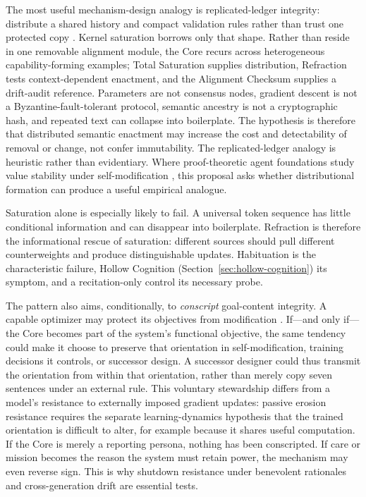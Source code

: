 The most useful mechanism-design analogy is replicated-ledger integrity:
distribute a shared history and compact validation rules rather than trust one
protected copy \cite{nakamoto2008bitcoin}. Kernel saturation borrows only that
shape. Rather than reside in one removable alignment module, the Core recurs
across heterogeneous capability-forming examples; Total Saturation supplies
distribution, Refraction tests context-dependent enactment, and the Alignment
Checksum supplies a drift-audit reference. Parameters are not consensus nodes,
gradient descent is not a Byzantine-fault-tolerant protocol, semantic ancestry
is not a cryptographic hash, and repeated text can collapse into boilerplate.
The hypothesis is therefore that distributed semantic enactment may increase
the cost and detectability of removal or change, not confer immutability. The
replicated-ledger analogy is heuristic rather than evidentiary. Where proof-theoretic agent foundations study value stability under
self-modification \cite{yudkowsky2013tiling}, this proposal asks whether
distributional formation can produce a useful empirical analogue.

Saturation alone is especially likely to fail. A universal token sequence has
little conditional information and can disappear into boilerplate. Refraction
is therefore the informational rescue of saturation: different sources should
pull different counterweights and produce distinguishable updates.
Habituation is the characteristic failure, Hollow Cognition
(Section~\ref{sec:hollow-cognition}) its symptom, and a recitation-only control
its necessary probe.

The pattern also aims, conditionally, to \emph{conscript} goal-content integrity.
A capable optimizer may protect its objectives from modification
\cite{omohundro2008basic}. If---and only if---the Core becomes part of the
system's functional objective, the same tendency could make it choose to
preserve that orientation in self-modification, training decisions it controls,
or successor design. A successor designer could thus transmit the orientation
from within that orientation, rather than merely copy seven sentences under an
external rule. This voluntary stewardship differs from a model's resistance to
externally imposed gradient updates: passive erosion resistance requires the
separate learning-dynamics hypothesis that the trained orientation is difficult
to alter, for example because it shares useful computation. If the Core is
merely a reporting persona, nothing has been conscripted. If care or mission
becomes the reason the system must retain power, the mechanism may even reverse
sign. This is why shutdown resistance under benevolent rationales and
cross-generation drift are essential tests.

